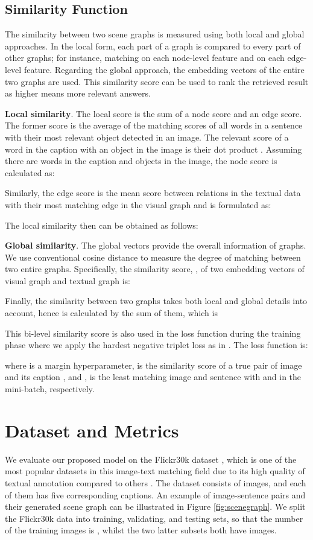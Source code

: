 \documentclass{IOS-Book-Article}
\begin{document}
\subsection{Similarity Function}
The similarity between two scene graphs is measured using both local and global approaches. In the local form, each part of a graph is compared to every part of other graphs; for instance, matching on each node-level feature and on each edge-level feature. Regarding the global approach, the embedding vectors of the entire two graphs are used. This similarity score can be used to rank the retrieved result as higher means more relevant answers.

\textbf{Local similarity}. The local score is the sum of a node score and an edge score. The former score is the average of the matching scores of all words in a sentence with their most relevant object detected in an image. The relevant score of a word  in the caption with an object in the image  is their dot product . Assuming there are  words in the caption and  objects in the image, the node score is calculated as:


Similarly, the edge score is the mean score between relations in the textual data with their most matching edge in the visual graph and is formulated as:


The local similarity then can be obtained as follows:


\textbf{Global similarity}. The global vectors provide the overall information of graphs. We use conventional cosine distance to measure the degree of matching between two entire graphs. Specifically, the similarity score, , of two embedding vectors of visual graph  and textual graph  is:

Finally, the similarity between two graphs takes both local and global details into account, hence is calculated by the sum of them, which is 


This bi-level similarity score is also used in the loss function during the training phase where we apply the hardest negative triplet loss as in \cite{faghri2017vse++,wang2020cross}. The loss function is:

where  is a margin hyperparameter,  is the similarity score of a true pair of image  and its caption , and ,  is the least matching image and sentence with  and  in the mini-batch, respectively.

\section{Dataset and Metrics}
We evaluate our proposed model on the Flickr30k dataset \cite{flickr30k}, which is one of the most popular datasets in this image-text matching field due to its high quality of textual annotation compared to others \cite{plummer2015flickr30k}. The dataset consists of  images, and each of them has five corresponding captions. An example of image-sentence pairs and their generated scene graph can be illustrated in Figure \ref{fig:scenegraph}. We split the Flickr30k data into training, validating, and testing sets, so that the number of the training images is , whilst the two latter subsets both have  images.
\end{document}
